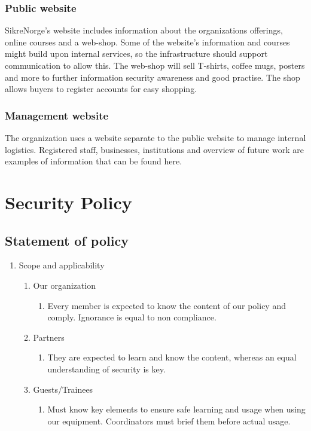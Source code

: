 \subsubsection{Public website}

SikreNorge's website includes information about the organizations offerings, online courses and a web-shop. Some of the website's information and courses might build upon internal services, so the infrastructure should support communication to allow this. The web-shop will sell T-shirts, coffee mugs, posters and more to further information security awareness and good practise. The shop allows buyers to register accounts for easy shopping.

\subsubsection{Management website}

The organization uses a website separate to the public website to manage internal logistics. Registered staff, businesses, institutions and overview of future work are examples of information that can be found here.


\section{Security Policy}


\subsection{Statement of policy}

\begin{enumerate}
  \item Scope and applicability
  \begin{enumerate}
    \item Our organization
      \begin{enumerate}
        \item Every member is expected to know the content of our policy and comply. Ignorance is equal to non compliance.
      \end{enumerate}
        \item Partners
      \begin{enumerate}
        \item They are expected to learn and know the content, whereas an equal understanding of security is key.
      \end{enumerate}
        \item Guests/Trainees
      \begin{enumerate}
        \item Must know key elements to ensure safe learning and usage when using our equipment. Coordinators must brief them before actual usage.
      \end{enumerate}
  \end{enumerate}
\end{enumerate}

